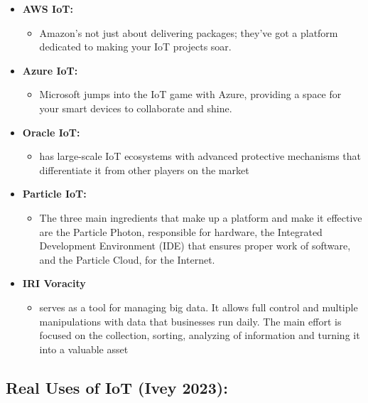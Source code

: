 \documentclass[
  letterpaper,
  DIV=11,
  numbers=noendperiod]{scrreprt}
\providecommand{\tightlist}{%
  \setlength{\itemsep}{0pt}\setlength{\parskip}{0pt}}\usepackage{longtable,booktabs,array}
\begin{document}
\begin{itemize}
\item
  \textbf{AWS IoT:}

  \begin{itemize}
  \tightlist
  \item
    Amazon's not just about delivering packages; they've got a platform
    dedicated to making your IoT projects soar.
  \end{itemize}
\item
  \textbf{Azure IoT:}

  \begin{itemize}
  \tightlist
  \item
    Microsoft jumps into the IoT game with Azure, providing a space for
    your smart devices to collaborate and shine.
  \end{itemize}
\item
  \textbf{Oracle IoT:}

  \begin{itemize}
  \tightlist
  \item
    has large-scale IoT ecosystems with advanced protective mechanisms
    that differentiate it from other players on the market
  \end{itemize}
\item
  \textbf{Particle IoT:}

  \begin{itemize}
  \tightlist
  \item
    The three main ingredients that make up a platform and make it
    effective are the Particle Photon, responsible for hardware, the
    Integrated Development Environment (IDE) that ensures proper work of
    software, and the Particle Cloud, for the Internet.
  \end{itemize}
\item
  \textbf{IRI Voracity}

  \begin{itemize}
  \tightlist
  \item
    serves as a tool for managing big data. It allows full control and
    multiple manipulations with data that businesses run daily. The main
    effort is focused on the collection, sorting, analyzing of
    information and turning it into a valuable asset
  \end{itemize}
\end{itemize}

\subsection{Real Uses of IoT (Ivey
2023):}\label{real-uses-of-iot-ivey2023iotapplications}
\end{document}
